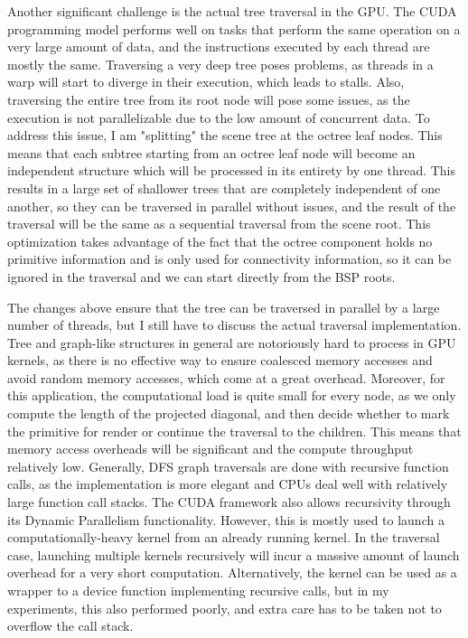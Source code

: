 Another significant challenge is the actual tree traversal in the GPU. The CUDA programming model performs well on tasks that perform the same operation on a very large amount of data, and the instructions executed by each thread are mostly the same. Traversing a very deep tree poses problems, as threads in a warp will start to diverge in their execution, which leads to stalls. Also, traversing the entire tree from its root node will pose some issues, as the execution is not parallelizable due to the low amount of concurrent data. To address this issue, I am "splitting" the scene tree at the octree leaf nodes. This means that each subtree starting from an octree leaf node will become an independent structure which will be processed in its entirety by one thread. This results in a large set of shallower trees that are completely independent of one another, so they can be traversed in parallel without issues, and the result of the traversal will be the same as a sequential traversal from the scene root. This optimization takes advantage of the fact that the octree component holds no primitive information and is only used for connectivity information, so it can be ignored in the traversal and we can start directly from the BSP roots.

The changes above ensure that the tree can be traversed in parallel by a large number of threads, but I still have to discuss the actual traversal implementation. Tree and graph-like structures in general are notoriously hard to process in GPU kernels, as there is no effective way to ensure coalesced memory accesses and avoid random memory accesses, which come at a great overhead. Moreover, for this application, the computational load is quite small for every node, as we only compute the length of the projected diagonal, and then decide whether to mark the primitive for render or continue the traversal to the children. This means that memory access overheads will be significant and the compute throughput relatively low. Generally, DFS graph traversals are done with recursive function calls, as the implementation is more elegant and CPUs deal well with relatively large function call stacks. The CUDA framework also allows recursivity through its Dynamic Parallelism functionality. However, this is mostly used to launch a computationally-heavy kernel from an already running kernel. In the traversal case, launching multiple kernels recursively will incur a massive amount of launch overhead for a very short computation. Alternatively, the kernel can be used as a wrapper to a device function implementing recursive calls, but in my experiments, this also performed poorly, and extra care has to be taken not to overflow the call stack.

